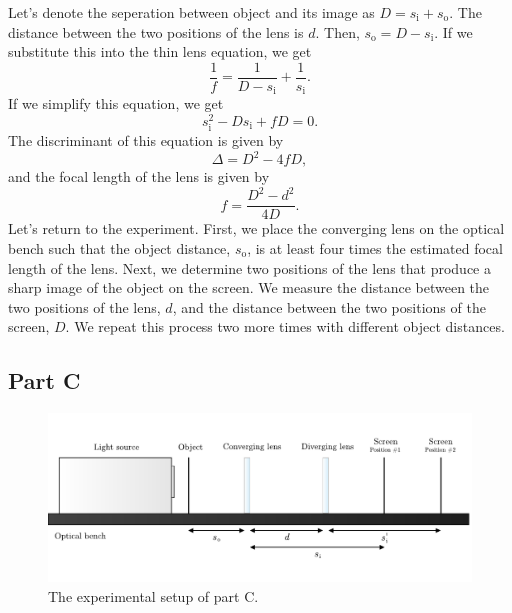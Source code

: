 \documentclass[10pt]{article}
\begin{document}
Let's denote the seperation between object and its image as $D = s_{\text{i}} + s_{\text{o}}$. The distance between the two positions of the lens is $d$. Then, $s_{\text{o}} = D - s_{\text{i}}$. If we substitute this into the thin lens equation, we get
\begin{equation}
  \dfrac{1}{f} = \dfrac{1}{D - s_{\text{i}}} + \dfrac{1}{s_{\text{i}}}.
\end{equation}
If we simplify this equation, we get
\begin{equation}
  s_{\text{i}}^2 - Ds_{\text{i}} + fD = 0.
\end{equation}
The discriminant of this equation is given by
\begin{equation}
  \Delta = D^2 - 4fD,
\end{equation}
and the focal length of the lens is given by
\begin{equation}
  f = \dfrac{D^2 - d^2}{4D}.
\end{equation}
Let's return to the experiment. First, we place the converging lens on the optical bench such that the object distance, $s_{\text{o}}$, is at least four times the estimated focal length of the lens. Next, we determine two positions of the lens that produce a sharp image of the object on the screen. We measure the distance between the two positions of the lens, $d$, and the distance between the two positions of the screen, $D$. We repeat this process two more times with different object distances.

\subsection*{Part C}

\begin{figure}[hbt!]
  \centering
  \includegraphics[scale=0.5]{figures/f6.pdf}
  \caption{The experimental setup of part C.}
  \label{fig:6}
\end{figure}
\end{document}
